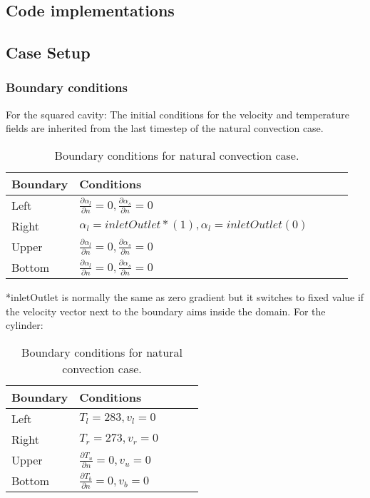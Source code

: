 \subsection{Code implementations}
\subsection{Case Setup}
\subsubsection*{Boundary conditions}

For the squared cavity:
The initial conditions for the velocity and temperature fields are inherited from the last timestep of the natural convection case.
\begin{table}[h!]
	\begin{tabular}{@{}lllll@{}}
		\toprule[1pt]
		\textbf{Boundary} & \textbf{Conditions}  \\ \midrule[2pt]
		Left & $\frac{\partial \alpha_{l}}{\partial n} = 0, \frac{\partial \alpha_{s}}{\partial n} = 0    $  \\
		Right & $\alpha_{l} = inletOutlet* (1), \alpha_{l} = inletOutlet (0) $ \\
		Upper & $\frac{\partial \alpha_{l}}{\partial n} = 0, \frac{\partial \alpha_{s}}{\partial n} = 0$  \\
		Bottom & $\frac{\partial \alpha_{l}}{\partial n} = 0, \frac{\partial \alpha_{s}}{\partial n} = 0 $  \\ \bottomrule[1pt]		
	\end{tabular}
	\centering
	\caption{Boundary conditions for natural convection case.}	
	\label{fig:boundaryCdsCavity}
\end{table}
*inletOutlet is normally the same as zero gradient but it switches to fixed value if the velocity vector next to the boundary aims inside the domain.
For the cylinder:
\begin{table}[h!]
	\begin{tabular}{@{}lllll@{}}
		\toprule[1pt]
		\textbf{Boundary} & \textbf{Conditions}  \\ \midrule[2pt]
		Left & $T_{l}=283, v_{l} = 0   $  \\
		Right & $T_{r}=273, v_{r} = 0 $ \\
		Upper & $\frac{\partial T_{u}}{\partial n} = 0, v_{u} = 0$  \\
		Bottom & $\frac{\partial T_{b}}{\partial n} = 0, v_{b} = 0$  \\ \bottomrule[1pt]		
	\end{tabular}
	\centering
	\caption{Boundary conditions for natural convection case.}	
	\label{fig:boundaryCdsCylinder}
\end{table}
